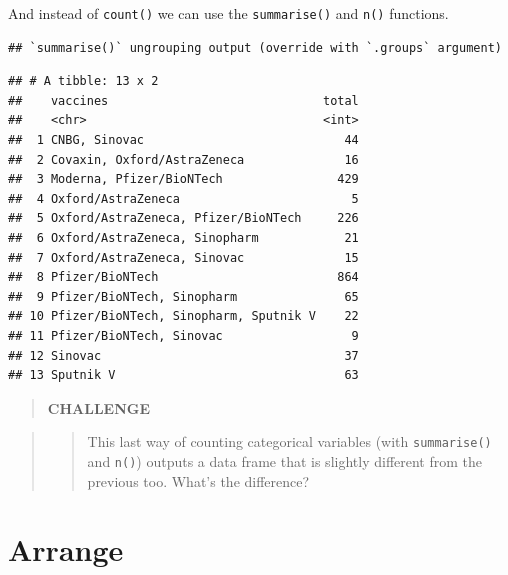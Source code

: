 \documentclass[
]{book}
\newenvironment{Shaded}{\begin{snugshade}}{\end{snugshade}}
\newcommand{\DataTypeTok}[1]{\textcolor[rgb]{0.13,0.29,0.53}{#1}}
\newcommand{\KeywordTok}[1]{\textcolor[rgb]{0.13,0.29,0.53}{\textbf{#1}}}
\newcommand{\NormalTok}[1]{#1}
\newcommand{\OperatorTok}[1]{\textcolor[rgb]{0.81,0.36,0.00}{\textbf{#1}}}
\newcommand{\StringTok}[1]{\textcolor[rgb]{0.31,0.60,0.02}{#1}}
\begin{document}
And instead of \texttt{count()} we can use the \texttt{summarise()} and \texttt{n()} functions.

\begin{Shaded}
\end{Shaded}

\begin{verbatim}
## `summarise()` ungrouping output (override with `.groups` argument)
\end{verbatim}

\begin{verbatim}
## # A tibble: 13 x 2
##    vaccines                              total
##    <chr>                                 <int>
##  1 CNBG, Sinovac                            44
##  2 Covaxin, Oxford/AstraZeneca              16
##  3 Moderna, Pfizer/BioNTech                429
##  4 Oxford/AstraZeneca                        5
##  5 Oxford/AstraZeneca, Pfizer/BioNTech     226
##  6 Oxford/AstraZeneca, Sinopharm            21
##  7 Oxford/AstraZeneca, Sinovac              15
##  8 Pfizer/BioNTech                         864
##  9 Pfizer/BioNTech, Sinopharm               65
## 10 Pfizer/BioNTech, Sinopharm, Sputnik V    22
## 11 Pfizer/BioNTech, Sinovac                  9
## 12 Sinovac                                  37
## 13 Sputnik V                                63
\end{verbatim}

\begin{quote}
\textbf{CHALLENGE}
\end{quote}

\begin{quote}
\begin{quote}
This last way of counting categorical variables (with \texttt{summarise()} and \texttt{n()}) outputs a data frame that is slightly different from the previous too. What's the difference?
\end{quote}
\end{quote}

\hypertarget{arrange}{%
\section{Arrange}\label{arrange}}
\end{document}
